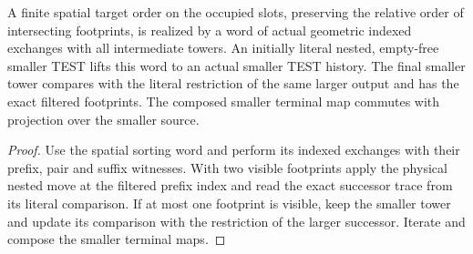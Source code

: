 \begin{theorem}
\label{hir:g8-physical-nested-indexed-word}
\leanok
A finite spatial target order on the occupied slots, preserving the
relative order of intersecting footprints, is realized by a word of
actual geometric indexed exchanges with all intermediate towers.
An initially literal nested, empty-free smaller TEST lifts this
word to an actual smaller TEST history. The final smaller tower
compares with the literal restriction of the same larger output
and has the exact filtered footprints. The composed smaller
terminal map commutes with projection over the smaller source.
\end{theorem}
\begin{proof}
Use the spatial sorting word and perform its indexed exchanges
with their prefix, pair and suffix witnesses. With two visible
footprints apply the physical nested move at the filtered prefix
index and read the exact successor trace from its literal
comparison. If at most one footprint is visible, keep the smaller
tower and update its comparison with the restriction of the
larger successor. Iterate and compose the smaller terminal maps.
\end{proof}

